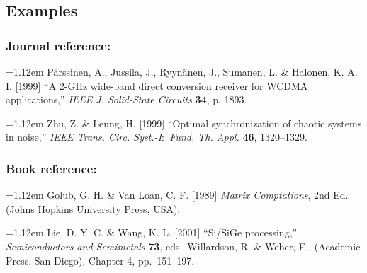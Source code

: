 \documentclass{ws-ijbc}
\begin{document}
\subsection*{Examples}

\subsubsection*{Journal reference:}

\hangindent=1.12em P\"arssinen, A., Jussila, J., Ryyn\"anen, J.,
Sumanen, L. \& Halonen, K.  A. I. [1999] ``A 2-GHz wide-band direct conversion receiver for WCDMA applications,'' {\it IEEE J. Solid-State
Circuits} {\bf 34}, p. 1893.

\noindent\hangindent=1.12em Zhu, Z. \& Leung, H. [1999] ``Optimal synchronization of chaotic systems in
noise,'' {\it IEEE Trans. Circ. Syst.-I\/$:$ Fund. Th. Appl.} {\bf 46},
1320--1329.

\subsubsection*{Book reference:}

\hangindent=1.12em Golub, G. H. \& Van Loan, C. F. [1989] {\it
Matrix Comptations}, 2nd Ed. (Johns Hopkins University Press,
USA).

\noindent\hangindent=1.12em Lie, D. Y. C. \& Wang, K. L. [2001]
``Si/SiGe processing,''
{\it Semiconductors and Semimetals} {\bf 73}, eds.~Willardson, R.
\& Weber, E., (Academic Press,
San Diego), Chapter 4, pp.~151--197.
\end{document}
